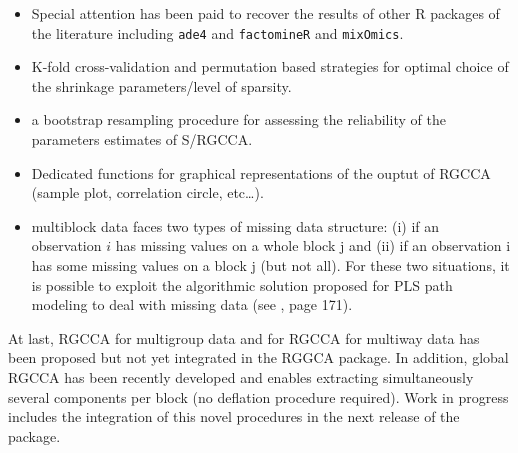 \documentclass[
]{jss}
\begin{document}
\begin{itemize}
\item
  Special attention has been paid to recover the results of other R
  packages of the literature including \texttt{ade4} and
  \texttt{factomineR} and \texttt{mixOmics}.
\item
  K-fold cross-validation and permutation based strategies for optimal
  choice of the shrinkage parameters/level of sparsity.
\item
  a bootstrap resampling procedure for assessing the reliability of the
  parameters estimates of S/RGCCA.
\item
  Dedicated functions for graphical representations of the ouptut of
  RGCCA (sample plot, correlation circle, etc\ldots).
\item
  multiblock data faces two types of missing data structure: (i) if an
  observation \(i\) has missing values on a whole block j and (ii) if an
  observation i has some missing values on a block j (but not all). For
  these two situations, it is possible to exploit the algorithmic
  solution proposed for PLS path modeling to deal with missing data (see
  \citep{Tenenhaus2005}, page 171).
\end{itemize}

At last, RGCCA for multigroup data \citep{Tenenhaus2014b} and for RGCCA
for multiway data \citep{Gloaguen2020} has been proposed but not yet
integrated in the RGGCA package. In addition, global RGCCA has been
recently developed and enables extracting simultaneously several
components per block (no deflation procedure required). Work in progress
includes the integration of this novel procedures in the next release of
the package.

\renewcommand\refname{References}

\end{document}
